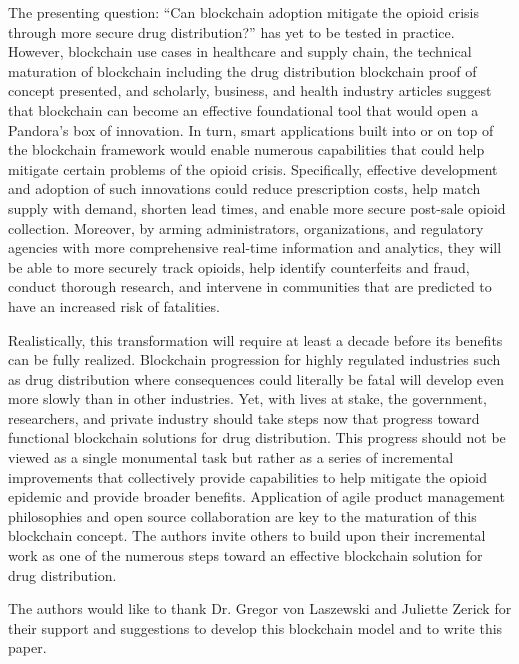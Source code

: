 \documentclass[sigconf]{acmart}
\begin{document}
The presenting question: ``Can blockchain adoption mitigate the opioid crisis through more secure drug distribution?'' has yet to be tested in practice. However, blockchain use cases in healthcare and supply chain, the technical maturation of blockchain including the drug distribution blockchain proof of concept presented, and scholarly, business, and health industry articles suggest that blockchain can become an effective foundational tool that would open a Pandora's box of innovation. In turn, smart applications built into or on top of the blockchain framework would enable numerous capabilities that could help mitigate certain problems of the opioid crisis. Specifically, effective development and adoption of such innovations could reduce prescription costs, help match supply with demand, shorten lead times, and enable more secure post-sale opioid collection. Moreover, by arming administrators, organizations, and regulatory agencies with more comprehensive real-time information and analytics, they will be able to more securely track opioids, help identify counterfeits and fraud, conduct thorough research, and intervene in communities that are predicted to have an increased risk of fatalities.

Realistically, this transformation will require at least a decade before its benefits can be fully realized. Blockchain progression for highly regulated industries such as drug distribution where consequences could literally be fatal will develop even more slowly than in other industries. Yet, with lives at stake, the government, researchers, and private industry should take steps now that progress toward functional blockchain solutions for drug distribution. This progress should not be viewed as a single monumental task but rather as a series of incremental improvements that collectively provide capabilities to help mitigate the opioid epidemic and provide broader benefits. Application of agile product management philosophies and open source collaboration are key to the maturation of this blockchain concept. The authors invite others to build upon their incremental work as one of the numerous steps toward an effective blockchain solution for drug distribution.

\begin{acks}
The authors would like to thank Dr. Gregor von Laszewski and Juliette Zerick for their support and suggestions to develop this blockchain model and to write this paper.
\end{acks}


 
\end{document}
